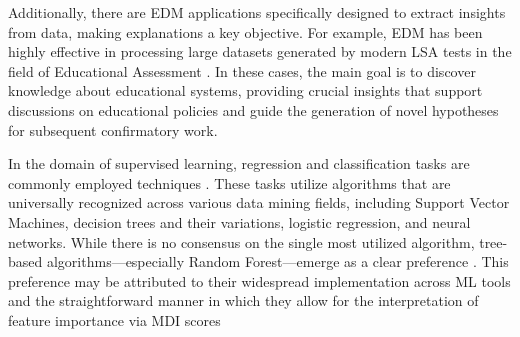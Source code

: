 Additionally, there are EDM applications specifically designed to extract insights from data, making explanations a key objective. For example, EDM has been highly effective in processing large datasets generated by modern LSA tests in the field of Educational Assessment \cite{Liu2008UsingEnergy, CardosoSilvaFilho2023BeyondEffectiveness, SilvaFilho2023LeveragingEducation, Saarela2016PredictingApproach}. In these cases, the main goal is to discover knowledge about educational systems, providing crucial insights that support discussions on educational policies and guide the generation of novel hypotheses for subsequent confirmatory work.

In the domain of supervised learning, regression and classification tasks are commonly employed techniques \cite{Aldowah2019EducationalSynthesis}. These tasks utilize algorithms that are universally recognized across various data mining fields, including Support Vector Machines, decision trees and their variations, logistic regression, and neural networks. While there is no consensus on the single most utilized algorithm, tree-based algorithms—especially Random Forest—emerge as a clear preference \cite{Rastrollo-Guerrero2020AnalyzingReview, Khan2021StudentStudies, Martinez-Abad2020EducationalAssessment, Namoun2020PredictingReview}. This preference may be attributed to their widespread implementation across ML tools and the straightforward manner in which they allow for the interpretation of feature importance via MDI scores






